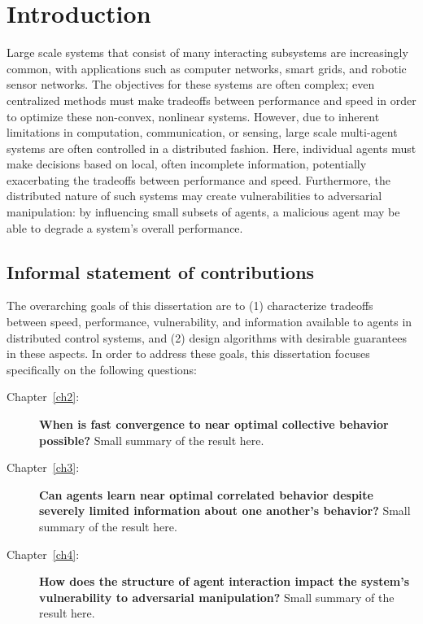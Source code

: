 \chapter{Introduction}
\label{introchap}

Large scale systems that consist of many interacting subsystems are increasingly common, with applications such as computer networks, smart grids, and robotic sensor networks. The objectives for these systems are often complex; even centralized methods must make tradeoffs between performance and speed in order to optimize these non-convex, nonlinear systems. However, due to inherent limitations in computation, communication, or sensing, large scale multi-agent systems are often controlled in a distributed fashion. Here, individual agents must make decisions based on local, often incomplete information, potentially exacerbating the tradeoffs between performance and speed. Furthermore, the distributed nature of such systems may create vulnerabilities to adversarial manipulation: by influencing small subsets of agents, a malicious agent may be able to degrade a system's overall performance.%

\section{Informal statement of contributions}

The overarching goals of this dissertation are to (1) characterize tradeoffs between speed, performance, vulnerability, and information available to agents in distributed control systems, and (2) design algorithms with desirable guarantees in these aspects. %
In order to address these goals, this dissertation focuses specifically on the following questions:

\begin{description}
\item[Chapter~\ref{ch2}:] \textbf{When is fast convergence to near optimal collective behavior possible?}
Small summary of the result here.
\item[Chapter~\ref{ch3}:] \textbf{Can agents learn near optimal correlated behavior despite severely limited information about one another's behavior?}
Small summary of the result here.
\item[Chapter~\ref{ch4}:] \textbf{How does the structure of agent interaction impact the system's vulnerability to adversarial manipulation?} 
Small summary of the result here.
\end{description}

